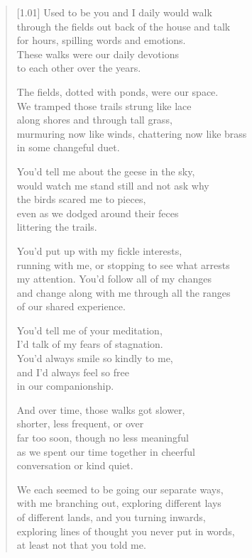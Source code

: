 
\begin{verse}[1.01\textwidth]
Used to be you and I daily would walk\\
through the fields out back of the house and talk\\
for hours, spilling words and emotions.\\
These walks were our daily devotions\\
to each other over the years.

The fields, dotted with ponds, were our space.\\
We tramped those trails strung like lace\\
along shores and through tall grass,\\
murmuring now like winds, chattering now like brass\\
in some changeful duet.

You'd tell me about the geese in the sky,\\
would watch me stand still and not ask why\\
the birds scared me to pieces,\\
even as we dodged around their feces\\
littering the trails.

You'd put up with my fickle interests,\\
running with me, or stopping to see what arrests\\
my attention. You'd follow all of my changes\\
and change along with me through all the ranges\\
of our shared experience.

\newpage

You'd tell me of your meditation,\\
I'd talk of my fears of stagnation.\\
You'd always smile so kindly to me,\\
and I'd always feel so free\\
in our companionship.

And over time, those walks got slower,\\
shorter, less frequent, or over\\
far too soon, though no less meaningful\\
as we spent our time together in cheerful\\
conversation or kind quiet.

We each seemed to be going our separate ways,\\
with me branching out, exploring different lays\\
of different lands, and you turning inwards,\\
exploring lines of thought you never put in words,\\
at least not that you told me.


\end{verse}
